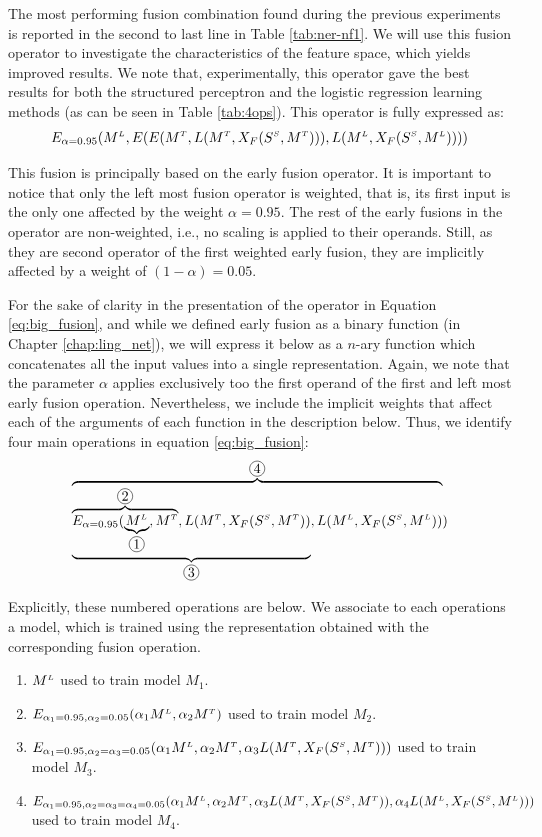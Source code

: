 The most performing fusion combination found during the previous experiments is reported in the second to last line in Table \ref{tab:ner-nf1}. We will use this fusion operator to investigate the characteristics of the feature space, which yields improved results. We note that, experimentally, this operator gave the best results for both the structured perceptron and the logistic regression learning methods (as can be seen in Table \ref{tab:4ops}). This operator is fully expressed as:    
\begin{equation}\label{eq:big_fusion}
E_{\alpha=0.95}(M^{\scriptscriptstyle L},  E(E(M^{\scriptscriptstyle T}, 	 L(M^{\scriptscriptstyle T}, X_F(S^{\scriptscriptstyle S}, M^{\scriptscriptstyle T}))), L(M^{\scriptscriptstyle L}, X_F(S^{\scriptscriptstyle S}, M^{\scriptscriptstyle L}))))
\end{equation}

This fusion is principally based on the early fusion operator. It is important to notice that only the left most fusion operator is weighted, that is, its first input is the only one affected by the weight $\alpha=0.95$. The rest of the early fusions in the operator are non-weighted, i.e., no scaling is applied to their operands. Still, as they are second operator of the first weighted early fusion, they are implicitly affected by a weight of $(1-\alpha)=0.05$.

For the sake of clarity in the presentation of the operator in Equation \ref{eq:big_fusion}, and while we defined early fusion as a binary function (in Chapter \ref{chap:ling_net}), we will express it below as a $n$-ary function which concatenates all the input values into a single representation. Again, we note that the parameter $\alpha$ applies exclusively too the first operand of the first and left most early fusion operation. Nevertheless, we include the implicit weights that affect each of the arguments of each function in the description below. Thus, we identify four main operations in equation \ref{eq:big_fusion}:
\begin{equation}\label{eq:big_fusion2}
\overbrace{\underbrace{\overbrace{E_{\alpha=0.95}(\underbrace{\mlex}_{\circled{1}},\mstd}^{\circled{2}},L(\mstd, X_F(\ssyn, \mstd))}_{\circled{3}}, L(\mlex, X_F(\ssyn, \mlex))}^{\circled{4}})
\end{equation}


Explicitly, these numbered operations are below. We associate to each operations a model, which is trained using the representation obtained with the corresponding fusion operation.
\begin{enumerate}
\item[\circled{1}] $M^{\scriptscriptstyle L}$ \label{eq:f1} used to train model $M_1$.
\item[\circled{2}] $E_{\alpha_1=0.95,\alpha_2=0.05}(\alpha_1M^{\scriptscriptstyle L}, \alpha_2M^{\scriptscriptstyle T})$ \label{eq:f2} used to train model $M_2$.
\item[\circled{3}] $E_{\alpha_1=0.95,\alpha_2=\alpha_3=0.05}(\alpha_1M^{\scriptscriptstyle L}, \alpha_2M^{\scriptscriptstyle T}, \alpha_3L(M^{\scriptscriptstyle T}, X_F(S^{\scriptscriptstyle S}, M^{\scriptscriptstyle T})))$ used to train model $M_3$. \label{eq:f3}
\item[\circled{4}] $E_{\alpha_1=0.95,\alpha_2=\alpha_3=\alpha_4=0.05}(\alpha_1M^{\scriptscriptstyle L}, \alpha_2M^{\scriptscriptstyle T}, \alpha_3L(M^{\scriptscriptstyle T}, X_F(S^{\scriptscriptstyle S}, M^{\scriptscriptstyle T})), \alpha_4L(M^{\scriptscriptstyle L}, X_F(S^{\scriptscriptstyle S}, M^{\scriptscriptstyle L})))$ used to train model $M_4$. \label{eq:f4}
\end{enumerate}

